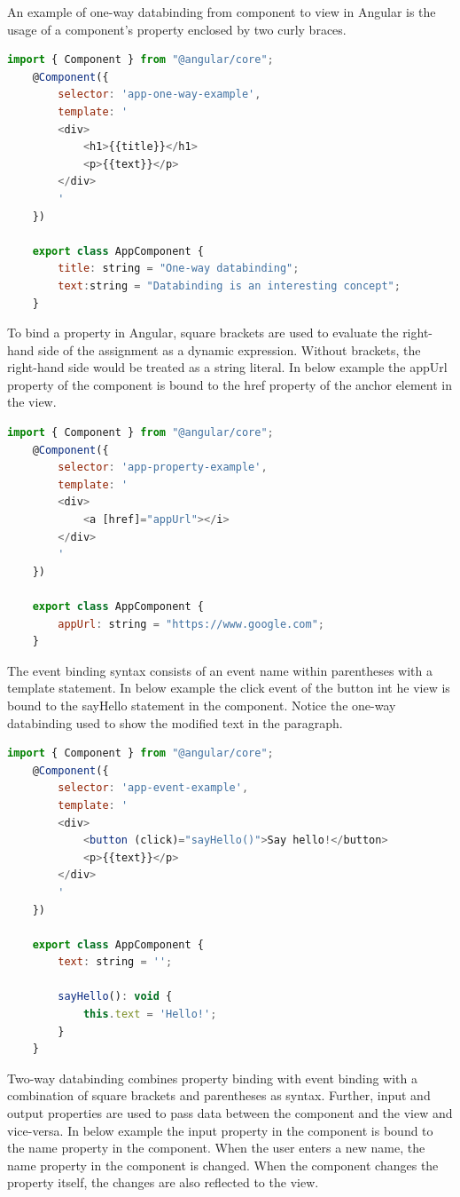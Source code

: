 An example of one-way databinding from component to view in Angular is the usage of a component's property enclosed by two curly braces.
\begin{lstlisting}[language=Javascript]
	import { Component } from "@angular/core";
	@Component({
		selector: 'app-one-way-example',
		template: '
		<div>
			<h1>{{title}}</h1>
			<p>{{text}}</p>
		</div>
		'
	})
	
	export class AppComponent {
		title: string = "One-way databinding";
		text:string = "Databinding is an interesting concept";
	}
\end{lstlisting}

To bind a property in Angular, square brackets are used to evaluate the right-hand side of the assignment as a dynamic expression. Without brackets, the right-hand side would be treated as a string literal. In below example the appUrl property of the component is bound to the href property of the anchor element in the view.
\begin{lstlisting}[language=Javascript]
	import { Component } from "@angular/core";
	@Component({
		selector: 'app-property-example',
		template: '
		<div>
			<a [href]="appUrl"></i>
		</div>
		'
	})
	
	export class AppComponent {
		appUrl: string = "https://www.google.com";
	}
\end{lstlisting}

The event binding syntax consists of an event name within parentheses with a template statement. In below example the click event of the button int he view is bound to the sayHello statement in the component. Notice the one-way databinding used to show the modified text in the paragraph.
\begin{lstlisting}[language=Javascript]
	import { Component } from "@angular/core";
	@Component({
		selector: 'app-event-example',
		template: '
		<div>
			<button (click)="sayHello()">Say hello!</button>
			<p>{{text}}</p>
		</div>
		'
	})
	
	export class AppComponent {
		text: string = '';
		
		sayHello(): void {
			this.text = 'Hello!';
		}
	}
\end{lstlisting}


Two-way databinding combines property binding with event binding with a combination of square brackets and parentheses as syntax. Further, input and output properties are used to pass data between the component and the view and vice-versa. In below example the input property in the component is bound to the name property in the component. When the user enters a new name, the name property in the component is changed. When the component changes the property itself, the changes are also reflected to the view.

